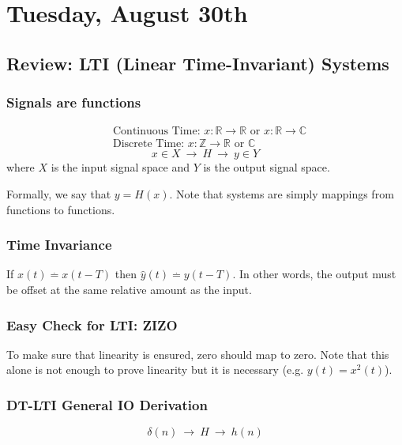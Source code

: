 \section{Tuesday, August 30th}
\subsection{Review: LTI (Linear Time-Invariant) Systems}

\subsubsection{Signals are functions}
    \begin{align*}
    &\text{Continuous Time: } x : \mathbb{R} \rightarrow \mathbb{R} 
    \text{ or } x : \mathbb{R} \rightarrow\mathbb{C}
    \\
    &\text{Discrete Time: } x :  \mathbb{Z} \rightarrow \mathbb{R} \text{ or } \mathbb{C}
    \end{align*}
    \[
        x \in X \ \rightarrow \ \boxed{H} \ \rightarrow \  y \in Y
    \]
    where $X$ is the input signal space and $Y$ is the output signal space.
    
    Formally, we say that $y=H(x)$. Note that systems are simply mappings from functions to functions.
    
\subsubsection{Time Invariance}
    \begin{shaded}
    If $\hat x(t)\stackrel{.} = x(t-T)$ then $\hat y(t) \stackrel.= y(t-T)$. In other words, the output must be offset at the same relative amount as the input.
    \end{shaded}
    
\subsubsection{Easy Check for LTI: ZIZO}
    To make sure that linearity is ensured, zero should map to zero. Note that this alone is not enough to prove linearity but it is necessary (e.g. $y(t)=x^2(t)$).

\subsubsection{DT-LTI General IO Derivation}
    \[
        \delta(n) \ \rightarrow \ \boxed{H} \ \rightarrow \  h(n)
    \]
    
